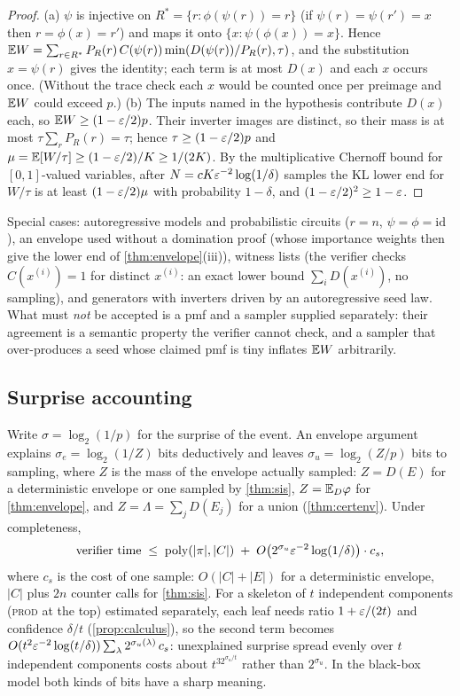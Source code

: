 \begin{proof}
(a) $\psi$ is injective on $R^*=\{r:\phi(\psi(r))=r\}$ (if
$\psi(r)=\psi(r')=x$ then $r=\phi(x)=r'$) and maps it onto
$\{x:\psi(\phi(x))=x\}$. Hence $\mathbb{E}
W=\sum_{r\in R^*}P_R(r)\,C(\psi(r))\min(D(\psi(r))/P_R(r),\tau)$, and the
substitution $x=\psi(r)$ gives the identity; each term is at most $D(x)$ and
each $x$ occurs once. (Without the trace check each $x$ would be counted once
per preimage and $\mathbb{E} W$ could exceed $p$.) (b) The inputs named in the
hypothesis contribute $D(x)$ each, so $\mathbb{E} W\ge(1-\varepsilon/2)p$. Their inverter
images are distinct, so their mass is at most $\tau\sum_rP_R(r)=\tau$; hence
$\tau\ge(1-\varepsilon/2)p$ and $\mu=\mathbb{E}[W/\tau]\ge(1-\varepsilon/2)/K\ge1/(2K)$. By the
multiplicative Chernoff bound for $[0,1]$-valued variables, after
$N=cK\varepsilon^{-2}\log(1/\delta)$ samples the KL lower end for $W/\tau$ is at least
$(1-\varepsilon/2)\mu$ with probability $1-\delta$, and $(1-\varepsilon/2)^2\ge1-\varepsilon$.
\end{proof}

Special cases: autoregressive models and probabilistic circuits ($r=n$,
$\psi=\phi=\mathrm{id}$), an envelope used without a domination proof (whose
importance weights then give the lower end of \cref{thm:envelope}(iii)),
witness lists (the verifier checks $C(x^{(i)})=1$ for distinct $x^{(i)}$: an
exact lower bound $\sum_iD(x^{(i)})$, no sampling), and generators with
inverters driven by an autoregressive seed law. What must \emph{not} be
accepted is a pmf and a sampler supplied separately: their agreement is a
semantic property the verifier cannot check, and a sampler that over-produces
a seed whose claimed pmf is tiny inflates $\mathbb{E} W$ arbitrarily.

\subsection{Surprise accounting}\label{sec:surprise}

Write $\sigma=\log_2(1/p)$ for the surprise of the event. An envelope argument
explains $\sigma_e=\log_2(1/Z)$ bits deductively and leaves
$\sigma_u=\log_2(Z/p)$ bits to sampling, where $Z$ is the mass of the envelope
actually sampled: $Z=D(E)$ for a deterministic envelope or one sampled by
\cref{thm:sis}, $Z=\mathbb{E}_D\varphi$ for \cref{thm:envelope}, and
$Z=\Lambda=\sum_jD(E_j)$ for a union (\cref{thm:certenv}). Under completeness,
\[
\text{verifier time}\;\le\;\mathrm{poly}(|\pi|,|C|)\;+\;O\big(2^{\sigma_u}\varepsilon^{-2}\log(1/\delta)\big)\cdot c_s,
\]
where $c_s$ is the cost of one sample: $O(|C|+|E|)$ for a deterministic
envelope, $|C|$ plus $2n$ counter calls for \cref{thm:sis}. For a skeleton of
$t$ independent components (\textsc{prod} at the top) estimated separately,
each leaf needs ratio $1+\varepsilon/(2t)$ and confidence $\delta/t$
(\cref{prop:calculus}), so the second term becomes
$O(t^2\varepsilon^{-2}\log(t/\delta))\sum_\lambda2^{\sigma_u(\lambda)}\,c_s$:
unexplained surprise spread evenly over $t$ independent components costs about
$t^32^{\sigma_u/t}$ rather than $2^{\sigma_u}$. In the black-box model both
kinds of bits have a sharp meaning.

